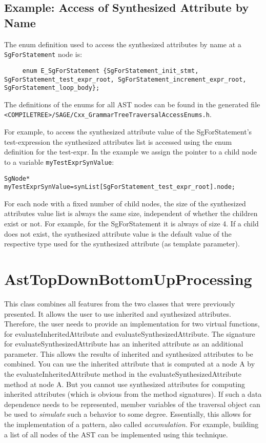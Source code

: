 \subsection{Example: Access of Synthesized Attribute by Name}

The enum definition used to access the synthesized attributes by name at 
a {\tt SgForStatement} node is:
{\indent
{\mySmallFontSize
\begin{verbatim}
     enum E_SgForStatement {SgForStatement_init_stmt, SgForStatement_test_expr_root, SgForStatement_increment_expr_root, SgForStatement_loop_body};
\end{verbatim}
}}
The definitions of the enums for all AST nodes can be found in the generated file
\verb+<COMPILETREE>/SAGE/Cxx_GrammarTreeTraversalAccessEnums.h+.

For example, to access the synthesized attribute value of the SgForStatement's
test-expression the synthesized attributes list is accessed using the enum definition
for the test-expr. In the example we assign the pointer to a child node to a variable
{\tt myTestExprSynValue}:

{\indent
{\mySmallFontSize
\begin{verbatim}
SgNode* myTestExprSynValue=synList[SgForStatement_test_expr_root].node;
\end{verbatim}
}}
For each node with a fixed number of child nodes, the size of the synthesized
attributes value list is always the same size, independent of whether the children
exist or not. For example, for the SgForStatement it is always of size 4. If a child
does not exist, the synthesized attribute value is the default value of the respective
type used for the synthesized attribute (as template parameter).

\section{AstTopDownBottomUpProcessing}
\label{AstProcessing:AstTopDownBottomUpProcessing}

This class combines all features from the two classes that were previously presented.  It
allows the user to use inherited and synthesized attributes. Therefore, the user needs
to provide an implementation for two virtual functions, for
evaluateInheritedAttribute and evaluateSynthesizedAttribute. The
signature for evaluateSynthesizedAttribute has an inherited attribute
as an additional parameter. This allows the results of
inherited and synthesized attributes to be combined. You can use the
inherited attribute that is computed at a
node A by the evaluateInheritedAttribute method in the evaluateSynthesizedAttribute method at node A. But you cannot
use synthesized attributes for computing inherited attributes (which is obvious from the method signatures). If such a data
dependence needs to be represented, member variables of the traversal
object can be used to {\em simulate} such a behavior to some
degree. Essentially, this allows for the implementation of a pattern, also called
{\em accumulation.} For example, building a list of all nodes of the AST
can be implemented using this technique.

